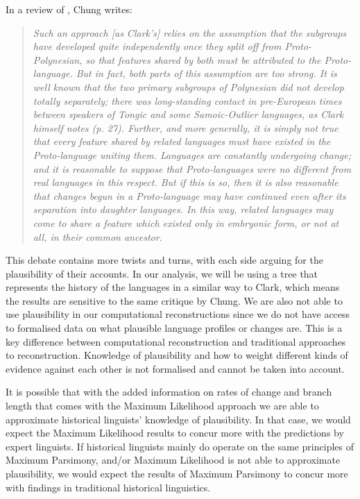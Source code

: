\documentclass[draft,10pt]{article} %
\begin{document}
In a review of \citet{clark1976aspects}, Chung writes:

\begin{quotation}
\noindent\emph{Such an approach [as Clark's] relies on the assumption that the subgroups have developed quite independently once they split off from Proto-Polynesian, so that features shared by both must be attributed to the Proto-language. But in fact, both parts of this assumption are too strong. It is well known that the two primary subgroups of Polynesian did not develop totally separately; there was long-standing contact in pre-European times between speakers of Tongic and some Samoic-Outlier languages, as Clark himself notes (p. 27). Further, and more generally, it is simply not true that every feature shared by related languages must have existed in the Proto-language uniting them. Languages are constantly undergoing change; and it is reasonable to suppose that Proto-languages were no different from real languages in this respect. But if this is so, then it is also reasonable that changes begun in a Proto-language may have continued even after its separation into daughter languages. In this way, related languages may come to share a feature which existed only in embryonic form, or not at all, in their common ancestor.}
\end{quotation}
\begin{flushright} \citet[539]{chung1977aspects}  \end{flushright}

This debate contains more twists and turns, with each side arguing for the plausibility of their accounts. In our analysis, we will be using a tree that represents the history of the languages in a similar way to Clark, which means the results are sensitive to the same critique by Chung. We are also not able to use plausibility in our computational reconstructions since we do not have access to formalised data on what plausible language profiles or changes are. This is a key difference between computational reconstruction and traditional approaches to reconstruction. Knowledge of plausibility and how to weight different kinds of evidence against each other is not formalised and cannot be taken into account.

It is possible that with the added information on rates of change and branch length that comes with the Maximum Likelihood approach we are able to approximate historical linguists' knowledge of plausibility. In that case, we would expect the Maximum Likelihood results to concur more with the predictions by expert linguists. If historical linguists mainly do operate on the same principles of Maximum Parsimony, and/or Maximum Likelihood is not able to approximate plausibility, we would expect the results of Maximum Parsimony to concur more with findings in traditional historical linguistics.
\end{document}
